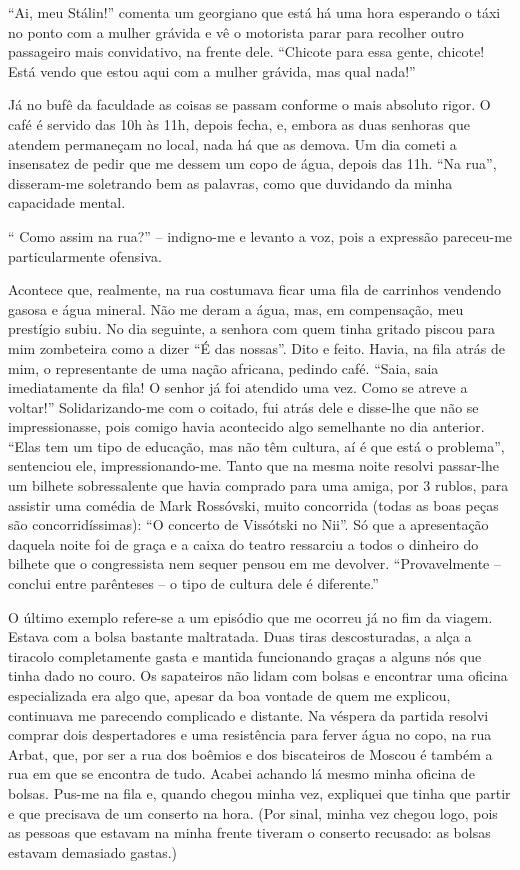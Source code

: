 ``Ai, meu Stálin!'' comenta um georgiano que está há uma hora esperando
o táxi no ponto com a mulher grávida e vê o motorista parar para
recolher outro passageiro mais convidativo, na frente dele. ``Chicote
para essa gente, chicote! Está vendo que estou aqui com a mulher
grávida, mas qual nada!''

Já no bufê da faculdade as coisas se passam conforme o mais absoluto
rigor. O café é servido das 10h às 11h, depois fecha, e, embora as duas
senhoras que atendem permaneçam no local, nada há que as demova. Um dia
cometi a insensatez de pedir que me dessem um copo de água, depois das
11h. ``Na rua'', disseram-me soletrando bem as palavras, como que
duvidando da minha capacidade mental.

`` Como assim na rua?'' -- indigno-me e levanto a voz, pois a expressão
pareceu-me particularmente ofensiva.

Acontece que, realmente, na rua costumava ficar uma fila de carrinhos
vendendo gasosa e água mineral. Não me deram a água, mas, em
compensação, meu prestígio subiu. No dia seguinte, a senhora com quem
tinha gritado piscou para mim zombeteira como a dizer ``É das nossas''.
Dito e feito. Havia, na fila atrás de mim, o representante de uma nação
africana, pedindo café. ``Saia, saia imediatamente da fila! O senhor já
foi atendido uma vez. Como se atreve a voltar!'' Solidarizando-me com o
coitado, fui atrás dele e disse-lhe que não se impressionasse, pois
comigo havia acontecido algo semelhante no dia anterior. ``Elas tem um
tipo de educação, mas não têm cultura, aí é que está o problema'',
sentenciou ele, impressionando-me. Tanto que na mesma noite resolvi
passar-lhe um bilhete sobressalente que havia comprado para uma amiga,
por 3 rublos, para assistir uma comédia de Mark Rossóvski, muito
concorrida (todas as boas peças são concorridíssimas): ``O concerto de
Vissótski no Nii''. Só que a apresentação daquela noite foi de graça e a
caixa do teatro ressarciu a todos o dinheiro do bilhete que o
congressista nem sequer pensou em me devolver. ``Provavelmente --
conclui entre parênteses -- o tipo de cultura dele é diferente.''

O último exemplo refere-se a um episódio que me ocorreu já no fim da
viagem. Estava com a bolsa bastante maltratada. Duas tiras
descosturadas, a alça a tiracolo completamente gasta e mantida
funcionando graças a alguns nós que tinha dado no couro. Os sapateiros
não lidam com bolsas e encontrar uma oficina especializada era algo que,
apesar da boa vontade de quem me explicou, continuava me parecendo
complicado e distante. Na véspera da partida resolvi comprar dois
despertadores e uma resistência para ferver água no copo, na rua Arbat,
que, por ser a rua dos boêmios e dos biscateiros de Moscou é também a
rua em que se encontra de tudo. Acabei achando lá mesmo minha oficina de
bolsas. Pus-me na fila e, quando chegou minha vez, expliquei que tinha
que partir e que precisava de um conserto na hora. (Por sinal, minha vez
chegou logo, pois as pessoas que estavam na minha frente tiveram o
conserto recusado: as bolsas estavam demasiado gastas.)

